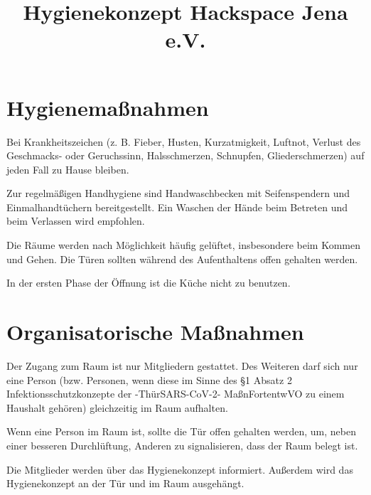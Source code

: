 \documentclass[a4paper,12pt,parskip=half]{scrartcl}
\title{Hygienekonzept Hackspace Jena e.V.}
\begin{document}
\maketitle

\section*{Hygienemaßnahmen}

Bei Krankheitszeichen (z. B. Fieber, Husten, Kurzatmigkeit, Luftnot, Verlust des
Geschmacks- oder Geruchssinn, Halsschmerzen, Schnupfen, Gliederschmerzen) auf jeden
Fall zu Hause bleiben.

Zur regelmäßigen Handhygiene sind Handwaschbecken mit Seifenspendern und
Einmalhandtüchern bereitgestellt. Ein Waschen der Hände beim Betreten und beim Verlassen wird empfohlen.

Die Räume werden nach Möglichkeit häufig gelüftet, insbesondere beim Kommen und Gehen. Die Türen sollten während des Aufenthaltens offen gehalten werden.

In der ersten Phase der Öffnung ist die Küche nicht zu benutzen.

\section*{Organisatorische Maßnahmen}

Der Zugang zum Raum ist nur Mitgliedern gestattet. Des Weiteren darf sich nur eine Person (bzw. Personen, wenn diese im Sinne des §1 Absatz 2 Infektionsschutzkonzepte der -ThürSARS-CoV-2-
MaßnFortentwVO zu einem Haushalt gehören) gleichzeitig im Raum aufhalten.

Wenn eine Person im Raum ist, sollte die Tür offen gehalten werden, um, neben einer besseren Durchlüftung, Anderen zu signalisieren, dass der Raum belegt ist. 

Die Mitglieder werden über das Hygienekonzept informiert. Außerdem wird das Hygienekonzept an der Tür und im Raum ausgehängt.
\end{document}
